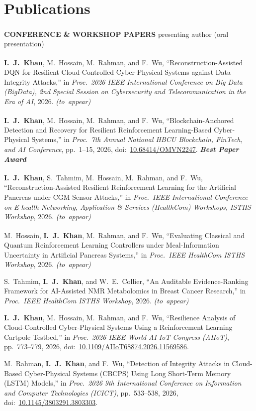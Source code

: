 \documentclass[10pt,letterpaper]{article}
\newcommand{\pres}{\textsuperscript{\dag}}
\newcommand{\presnote}[1]{ {\color{accent}\textit{#1}}}
\newcommand{\toappear}{ {\color{muted}\mbox{\textit{(to appear)}}}}
\begin{document}
\section{Publications}
\textbf{\color{muted}\footnotesize CONFERENCE \& WORKSHOP PAPERS}\hfill{\small\color{muted}\pres{} presenting author (oral presentation)}
\begin{enumerate}[leftmargin=2.1em,itemsep=1.5pt,topsep=2pt,label={[C\arabic*]}]
  \item \textbf{I.~J.~Khan}\pres, M.~Hossain, M.~Rahman, and F.~Wu, ``Reconstruction-Assisted DQN for Resilient
  Cloud-Controlled Cyber-Physical Systems against Data Integrity Attacks,'' in \textit{Proc.\ 2026 IEEE International
  Conference on Big Data (BigData), 2nd Special Session on Cybersecurity and Telecommunication in the Era of AI},
  2026.\toappear
  \item \textbf{I.~J.~Khan}\pres, M.~Hossain, M.~Rahman, and F.~Wu, ``Blockchain-Anchored Detection and Recovery for
  Resilient Reinforcement Learning-Based Cyber-Physical Systems,'' in \textit{Proc.\ 7th Annual National HBCU Blockchain,
  FinTech, and AI Conference}, pp.~1--15, 2026, doi:~\href{https://doi.org/10.68414/OMVN2247}{10.68414/OMVN2247}.
  \presnote{\textbf{Best Paper Award}}
  \item \textbf{I.~J.~Khan}\pres, S.~Tahmim, M.~Hossain, M.~Rahman, and F.~Wu, ``Reconstruction-Assisted Resilient
  Reinforcement Learning for the Artificial Pancreas under CGM Sensor Attacks,'' in
  \textit{Proc.\ IEEE International Conference on E-health Networking, Application \& Services (HealthCom)
  Workshops, ISTHS Workshop}, 2026.\toappear
  \item M.~Hossain, \textbf{I.~J.~Khan}\pres, M.~Rahman, and F.~Wu, ``Evaluating Classical and Quantum Reinforcement
  Learning Controllers under Meal-Information Uncertainty in Artificial Pancreas Systems,'' in
  \textit{Proc.\ IEEE HealthCom ISTHS Workshop}, 2026.\toappear
  \item S.~Tahmim, \textbf{I.~J.~Khan}, and W.~E.~Collier, ``An Auditable Evidence-Ranking Framework for
  AI-Assisted NMR Metabolomics in Breast Cancer Research,'' in \textit{Proc.\ IEEE HealthCom ISTHS Workshop},
  2026.\toappear
  \item \textbf{I.~J.~Khan}, M.~Hossain, M.~Rahman, and F.~Wu, ``Resilience Analysis of Cloud-Controlled
  Cyber-Physical Systems Using a Reinforcement Learning Cartpole Testbed,'' in \textit{Proc.\ 2026 IEEE World AI
  IoT Congress (AIIoT)}, pp.~773--779, 2026,
  doi:~\href{https://doi.org/10.1109/AIIoT68874.2026.11569586}{10.1109/AIIoT68874.2026.11569586}.
  \item M.~Rahman, \textbf{I.~J.~Khan}, and F.~Wu, ``Detection of Integrity Attacks in Cloud-Based
  Cyber-Physical Systems (CBCPS) Using Long Short-Term Memory (LSTM) Models,'' in \textit{Proc.\ 2026 9th
  International Conference on Information and Computer Technologies (ICICT)}, pp.~533--538, 2026,
  doi:~\href{https://doi.org/10.1145/3803291.3803303}{10.1145/3803291.3803303}.
\end{enumerate}
\end{document}
